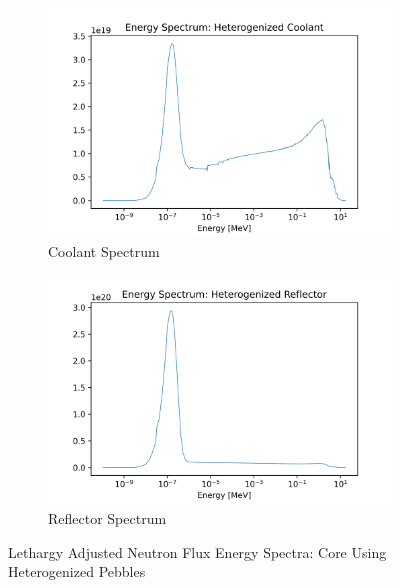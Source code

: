 \begin{figure}[h!]
\begin{subfigure}{0.25\textwidth}
  \includegraphics[width=0.95\linewidth]{figures/cool_spec_het}
  \caption{Coolant Spectrum}
  \label{fig:het-cool}
\end{subfigure}%
%
\begin{subfigure}{0.25\textwidth}
  \includegraphics[width=0.95\linewidth]{figures/reflect_spec_het}
  \caption{Reflector Spectrum}
  \label{fig:het-reflec}
\end{subfigure}%
%

\caption{Lethargy Adjusted Neutron Flux Energy Spectra: Core Using Heterogenized Pebbles}
\label{fig:hom-spec}
\end{figure}